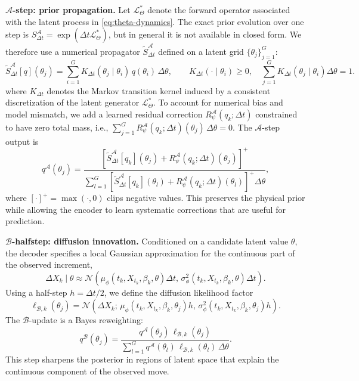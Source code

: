 \documentclass{article}
\begin{document}
\textbf{$\mathcal{A}$-step: prior propagation.}
Let $\mathcal{L}_{\Theta}^{\ast}$ denote the forward operator associated with the latent process in \eqref{eq:theta-dynamics}. The exact prior evolution over one step is $S_{\Delta t}^{\mathcal{A}} = \exp(\Delta t \mathcal{L}_{\Theta}^{\ast})$, but in general it is not available in closed form. We therefore use a numerical propagator $\widetilde{S}_{\Delta t}^{\mathcal{A}}$ defined on a latent grid $\{\theta_j\}_{j=1}^G$:
\begin{equation*}
\widetilde{S}_{\Delta t}^{\mathcal{A}}[q](\theta_j)
=
\sum_{i=1}^{G}
K_{\Delta t}(\theta_j \mid \theta_i)\,q(\theta_i)\,\Delta \theta,
\qquad
K_{\Delta t}(\cdot \mid \theta_i)\ge 0,
\quad
\sum_{j=1}^{G}K_{\Delta t}(\theta_j \mid \theta_i)\Delta \theta = 1.
\end{equation*}
where \(K_{\Delta t}\) denotes the Markov transition kernel induced by a consistent discretization of the latent generator \(\mathcal{L}_{\Theta}^{\ast}\). To account for numerical bias and model mismatch, we add a learned residual correction $R_{\psi}^{\mathcal{A}}(q_k;\Delta t)$ constrained to have zero total mass, i.e., $\sum_{j=1}^{G} R_{\psi}^{\mathcal{A}}(q_k;\Delta t)(\theta_j)\,\Delta\theta = 0$. The $\mathcal{A}$-step output is
\begin{equation*}
q^{\mathcal{A}}(\theta_j) = \frac{\left[\widetilde{S}_{\Delta t}^{\mathcal{A}}[q_k](\theta_j) + R_{\psi}^{\mathcal{A}}(q_k;\Delta t)(\theta_j)\right]^{+}}{\sum_{l=1}^{G}\left[\widetilde{S}_{\Delta t}^{\mathcal{A}}[q_k](\theta_l) + R_{\psi}^{\mathcal{A}}(q_k;\Delta t)(\theta_l)\right]^{+}\Delta\theta},
\end{equation*}
where $[\cdot]^{+} = \max(\cdot, 0)$ clips negative values. This preserves the physical prior while allowing the encoder to learn systematic corrections that are useful for prediction.

\textbf{$\mathcal{B}$-halfstep: diffusion innovation.}
Conditioned on a candidate latent value $\theta$, the decoder specifies a local Gaussian approximation for the continuous part of the observed increment,
\begin{equation*}
\Delta X_k \mid \theta
\approx
\mathcal{N}\!\left(
\mu_{\phi}(t_k,X_{t_k},\beta_k,\theta)\Delta t,\,
\sigma_{\phi}^2(t_k,X_{t_k},\beta_k,\theta)\Delta t
\right).
\end{equation*}
Using a half-step $h=\Delta t/2$, we define the diffusion likelihood factor
\begin{equation*}
\ell_{\mathcal{B},k}(\theta_j)
=
\mathcal{N}\!\left(
\Delta X_k;\,
\mu_{\phi}(t_k,X_{t_k},\beta_k,\theta_j)h,\,
\sigma_{\phi}^2(t_k,X_{t_k},\beta_k,\theta_j)h
\right).
\end{equation*}
The $\mathcal{B}$-update is a Bayes reweighting:
\begin{equation*}
q^{\mathcal{B}}(\theta_j)
=
\frac{q^{\mathcal{A}}(\theta_j)\,\ell_{\mathcal{B},k}(\theta_j)}
{\sum_{l=1}^{G} q^{\mathcal{A}}(\theta_l)\,\ell_{\mathcal{B},k}(\theta_l)\,\Delta\theta}.
\end{equation*}
This step sharpens the posterior in regions of latent space that explain the continuous component of the observed move.
\end{document}
